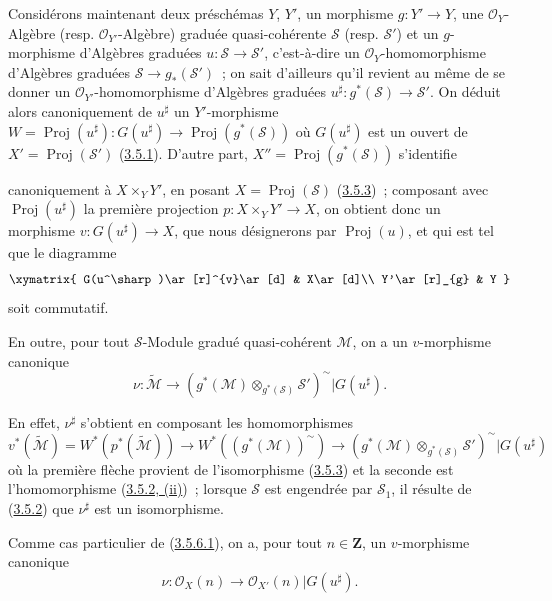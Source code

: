\begin{env}[3.5.6]
\label{II.3.5.6-fr}
Considérons maintenant deux préschémas $Y$, $Y'$, un morphisme
$g:Y'\to Y$, une $\mathcal{O}_Y$-Algèbre (resp.
$\mathcal{O}_{Y'}$-Algèbre) graduée quasi-cohérente $\mathcal{S}$ (resp.
$\mathcal{S}'$) et un $g$-morphisme d'Algèbres graduées
$u:\mathcal{S}\to\mathcal{S}'$, c'est-à-dire un
$\mathcal{O}_Y$-homomorphisme d'Algèbres graduées
$\mathcal{S}\to g_*(\mathcal{S}')$~; on sait d'ailleurs qu'il revient au même
de se donner un $\mathcal{O}_{Y'}$-homomorphisme d'Algèbres graduées
$u^\sharp:g^*(\mathcal{S})\to\mathcal{S}'$. On déduit alors canoniquement de
$u^\sharp$ un $Y'$-morphisme
$W=\operatorname{Proj}(u^\sharp):G(u^\sharp)\to
\operatorname{Proj}(g^*(\mathcal{S}))$ où $G(u^\sharp)$ est un ouvert de
$X'=\operatorname{Proj}(\mathcal{S}')$
(\hyperref[II.3.5.1-fr]{3.5.1}). D'autre part,
$X''=\operatorname{Proj}(g^*(\mathcal{S}))$ s'identifie


canoniquement à $X\times_Y Y'$, en posant
$X=\operatorname{Proj}(\mathcal{S})$
(\hyperref[II.3.5.3-fr]{3.5.3})~; composant avec
$\operatorname{Proj}(u^\sharp)$ la première projection
$p:X\times_Y Y'\to X$, on obtient donc un morphisme
$v:G(u^\sharp)\to X$, que nous désignerons par $\operatorname{Proj}(u)$, et
qui est tel que le diagramme
\[
  \xymatrix{
    G(u^\sharp)\ar[r]^{v}\ar[d]
    & X\ar[d]\\
    Y'\ar[r]_{g}
    & Y
  }
\]
soit commutatif.

En outre, pour tout $\mathcal{S}$-Module gradué quasi-cohérent $\mathcal{M}$,
on a un $v$-morphisme canonique
\[
\label{II.3.5.6.1-fr}
  \nu:\widetilde{\mathcal{M}}\longrightarrow
  (g^*(\mathcal{M})\otimes_{g^*(\mathcal{S})}\mathcal{S}')^{\sim}
  |G(u^\sharp).
\tag{3.5.6.1}
\]

En effet, $\nu^\sharp$ s'obtient en composant les homomorphismes
\[
  v^*(\widetilde{\mathcal{M}})
  =W^*(p^*(\widetilde{\mathcal{M}}))
  \longrightarrow W^*((g^*(\mathcal{M}))^{\sim})
  \longrightarrow
  (g^*(\mathcal{M})\otimes_{g^*(\mathcal{S})}\mathcal{S}')^{\sim}
  |G(u^\sharp)
\]
où la première flèche provient de l'isomorphisme
(\hyperref[II.3.5.3-fr]{3.5.3}) et la seconde est l'homomorphisme
(\hyperref[II.3.5.2-fr]{3.5.2, (ii)})~; lorsque $\mathcal{S}$ est engendrée
par $\mathcal{S}_1$, il résulte de (\hyperref[II.3.5.2-fr]{3.5.2}) que
$\nu^\sharp$ est un isomorphisme.

Comme cas particulier de (\hyperref[II.3.5.6.1-fr]{3.5.6.1}), on a, pour
tout $n\in\mathbf{Z}$, un $v$-morphisme canonique
\[
\label{II.3.5.6.2-fr}
  \nu:\mathcal{O}_X(n)\longrightarrow
  \mathcal{O}_{X'}(n)|G(u^\sharp).
\tag{3.5.6.2}
\]
\end{env}

